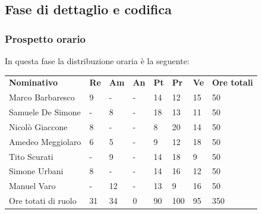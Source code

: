 \subsection{Fase di dettaglio e codifica}
    \subsubsection{Prospetto orario}
    In questa fase la distribuzione oraria è la seguente:
        \begin{center}
            \begin{table}[ht!]
                \centering
                \renewcommand{\arraystretch}{1.8}
                \begin{tabular}{p{100px} p{20px} p{20px} p{20px} p{20px} p{20px} p{20px} p{50px} }
                    \rowcolor{logo!70} \textbf{Nominativo} & \textbf{Re} & \textbf{Am} & \textbf{An} & \textbf{Pt} & \textbf{Pr} & \textbf{Ve} & \textbf{Ore totali}\\
                    Marco Barbaresco & 9 & - & - & 14 & 12 & 15 & 50\\
                    Samuele De Simone & - & 8 & - & 18 & 13 & 11 & 50\\
                    Nicolò Giaccone & 8 & - & - & 8 & 20 & 14 & 50\\
                    Amedeo Meggiolaro & 6 & 5 & - & 9 & 12 & 18 & 50\\
                    Tito Scurati & - & 9 & - & 14 & 18 & 9 & 50\\
                    Simone Urbani & 8 & - & - & 14 & 16 & 12 & 50\\
                    Manuel Varo & - & 12 & - & 13 & 9 & 16 & 50\\
                    Ore totati di ruolo & 31 & 34 & 0 & 90 & 100 & 95 & 350\\
                \end{tabular}
            \end{table}
        \end{center}
        \pagebreak
        
